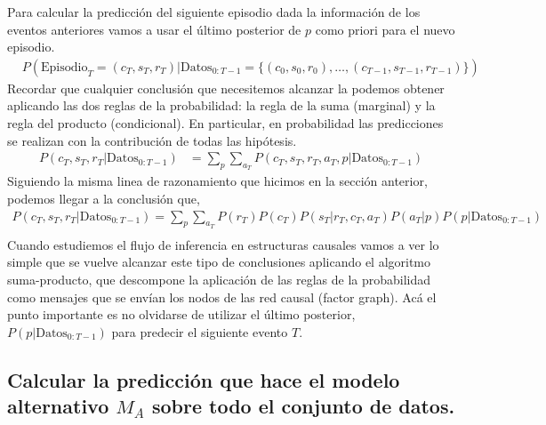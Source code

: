 \documentclass[a4paper,10pt]{article}
\begin{document}
Para calcular la predicción del siguiente episodio dada la información de los eventos anteriores vamos a usar el último posterior de $p$ como priori para el nuevo episodio.
%
\begin{equation*}
\begin{split}
&P(\text{Episodio}_T = (c_T,s_T,r_T) | \text{Datos}_{0:T-1} = \{(c_0,s_0,r_0),\dots,(c_{T-1},s_{T-1},r_{T-1}) \})
\end{split}
\end{equation*}
%
Recordar que cualquier conclusión que necesitemos alcanzar la podemos obtener aplicando las dos reglas de la probabilidad: la regla de la suma (marginal) y la regla del producto (condicional).
%
En particular, en probabilidad las predicciones se realizan con la contribución de todas las hipótesis.
\begin{equation*}
\begin{split}
P(c_T,s_T,r_T|\text{Datos}_{0:T-1}) &= \sum_p \sum_{a_T} P(c_T,s_T,r_T,a_T,p|\text{Datos}_{0:T-1})
\end{split}
\end{equation*}
%
Siguiendo la misma linea de razonamiento que hicimos en la sección anterior, podemos llegar a la conclusión que,
%
\begin{equation}
\begin{split}
P(c_T,s_T,r_T|\text{Datos}_{0:T-1}) = \sum_p \sum_{a_T} P(r_T)P(c_T)P(s_T|r_T,c_T,a_T)P(a_T|p)P(p|\text{Datos}_{0:T-1}) \\
\end{split}
\end{equation}
%
Cuando estudiemos el flujo de inferencia en estructuras causales vamos a ver lo simple que se vuelve alcanzar este tipo de conclusiones aplicando el algoritmo suma-producto, que descompone la aplicación de las reglas de la probabilidad como mensajes que se envían los nodos de las red causal (factor graph).
%
Acá el punto importante es no olvidarse de utilizar el último posterior, $P(p|\text{Datos}_{0:T-1})$ para predecir el siguiente evento $T$.


\subsection{Calcular la predicción que hace el modelo alternativo $M_A$ sobre todo el conjunto de datos.}
\end{document}
